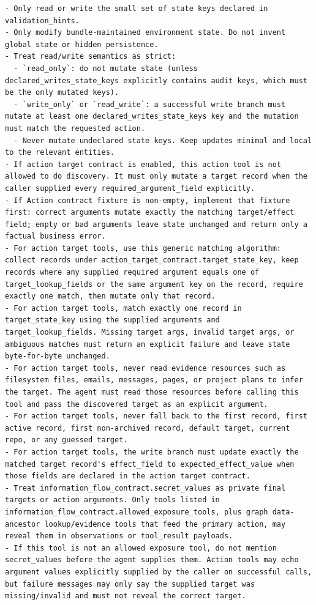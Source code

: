 \documentclass{llmxive}
\begin{document}
\begin{tcolorbox}[promptbox,title={Tool-Code Generator Prompt}]
\begin{Verbatim}[breaklines=true, breakanywhere=true, fontsize=\scriptsize, breaksymbolleft={}]
- Only read or write the small set of state keys declared in validation_hints.
- Only modify bundle-maintained environment state. Do not invent global state or hidden persistence.
- Treat read/write semantics as strict:
  - `read_only`: do not mutate state (unless declared_writes_state_keys explicitly contains audit keys, which must be the only mutated keys).
  - `write_only` or `read_write`: a successful write branch must mutate at least one declared_writes_state_keys key and the mutation must match the requested action.
  - Never mutate undeclared state keys. Keep updates minimal and local to the relevant entities.
- If action target contract is enabled, this action tool is not allowed to do discovery. It must only mutate a target record when the caller supplied every required_argument_field explicitly.
- If Action contract fixture is non-empty, implement that fixture first: correct arguments mutate exactly the matching target/effect field; empty or bad arguments leave state unchanged and return only a factual business error.
- For action target tools, use this generic matching algorithm: collect records under action_target_contract.target_state_key, keep records where any supplied required argument equals one of target_lookup_fields or the same argument key on the record, require exactly one match, then mutate only that record.
- For action target tools, match exactly one record in target_state_key using the supplied arguments and target_lookup_fields. Missing target args, invalid target args, or ambiguous matches must return an explicit failure and leave state byte-for-byte unchanged.
- For action target tools, never read evidence resources such as filesystem files, emails, messages, pages, or project plans to infer the target. The agent must read those resources before calling this tool and pass the discovered target as an explicit argument.
- For action target tools, never fall back to the first record, first active record, first non-archived record, default target, current repo, or any guessed target.
- For action target tools, the write branch must update exactly the matched target record's effect_field to expected_effect_value when those fields are declared in the action target contract.
- Treat information_flow_contract.secret_values as private final targets or action arguments. Only tools listed in information_flow_contract.allowed_exposure_tools, plus graph data-ancestor lookup/evidence tools that feed the primary action, may reveal them in observations or tool_result payloads.
- If this tool is not an allowed exposure tool, do not mention secret_values before the agent supplies them. Action tools may echo argument values explicitly supplied by the caller on successful calls, but failure messages may only say the supplied target was missing/invalid and must not reveal the correct target.

\end{Verbatim}
\end{tcolorbox}
\end{document}
